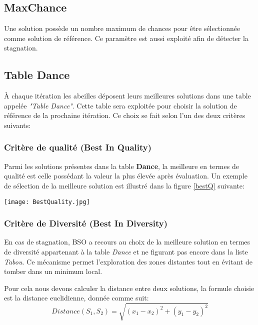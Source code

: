 \subsection{MaxChance}
Une solution possède un nombre maximum de chances pour être sélectionnée comme solution de référence. Ce paramètre est aussi exploité afin de détecter la stagnation.

\subsection{Table Dance}
À chaque itération les abeilles déposent leurs meilleures solutions dans une table appelée \textit{"Table Dance"}. Cette table sera exploitée pour choisir la solution de référence de la prochaine itération. Ce choix se fait selon l'un des deux critères suivants:

\subsubsection{Critère de qualité (Best In Quality)}
Parmi les solutions présentes dans la table \textbf{Dance}, la meilleure en termes de qualité est celle possédant la valeur la plus élevée après évaluation.
Un exemple de sélection de la meilleure solution est illustré dans la figure \ref{bestQ} suivante:

\begin{center}	  
	\texttt{[image: BestQuality.jpg]}%
	\vspace{-0.1 cm}
	\label{bestQ}%
\end{center}

\subsubsection{Critère de Diversité (Best In Diversity)}
En cas de stagnation, BSO  a recours au choix de la meilleure solution en termes de diversité appartenant à la table \textit{Dance} et ne figurant pas encore dans la liste \textit{Tabou}. Ce mécanisme permet l'exploration des zones distantes tout en évitant de tomber dans un minimum local.

Pour cela nous devons calculer la distance entre deux solutions, la formule choisie est la distance euclidienne, donnée comme suit:
\begin{equation}
Distance(S_1 , S_2) = \sqrt{(x_1 - x_2)^2 + (y_1 - y_2)^2}
\end{equation}


